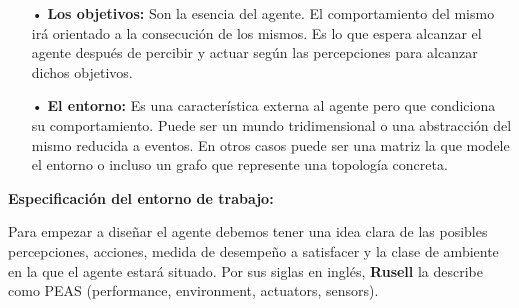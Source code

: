 \begin{itemize}
Inicialmente, la función del agente para un agente artificial se implementará mediante el programa del agente. Es importante diferenciar estas dos ideas. La función del agente es una descripción matemática abstracta; el programa del agente es una implementación completa, que se ejecuta sobre la arquitectura del agente. 
\vskip 0.1cm

En general, la arquitectura pone al alcance del programa las percepciones obtenidas mediante los sen­sores, lo ejecuta y alimenta al efector con las acciones elegidas por el programa conforme éstas se van generando. La relación entre agentes, arquitectura y programas podría resumirse de la siguiente manera:
\vskip 0.1cm

\begin{center}
{\bf Agente = Arquitectura + Programa}
\end{center}

Obviamente, el programa que se elija tiene que ser apropiado para la arquitectura. Si el programa tiene que recomendar acciones como Caminar, la arquitectura tiene que tener piernas. La arquitectura puede ser un PC común, o puede ser un coche robotizado con varios computadores, cámaras, y otros sensores a bordo. En general, la arquitectura hace que las percepciones de los sensores estén disponibles para el programa, ejecuta los programas, y se encarga de que los actuadores pongan en marcha las acciones generadas. (Russel)

\item[•] {\bf Los objetivos:}
\vskip 0.1cm Son la esencia del agente. El comportamiento del mismo irá orientado a la consecución de los mismos. Es lo que espera alcanzar el agente después de percibir y actuar según las percepciones para alcanzar dichos objetivos. 

\item[•] {\bf El entorno:}
\vskip 0.1cm Es una característica externa al agente pero que condiciona su comportamiento. Puede ser un mundo tridimensional o una abstracción del mismo reducida a eventos. En otros casos puede ser una matriz la que modele el entorno o incluso un grafo que represente una topología concreta.

\end{itemize}

{\bf Especificación del entorno de trabajo:}
 
Para empezar a diseñar el agente debemos tener una idea clara de las posibles percepciones, acciones, medida de desempeño a satisfacer y la clase de ambiente en la que el agente estará situado. Por sus siglas en inglés, {\bf Rusell} la describe como PEAS (performance, environment, actuators, sensors). 

